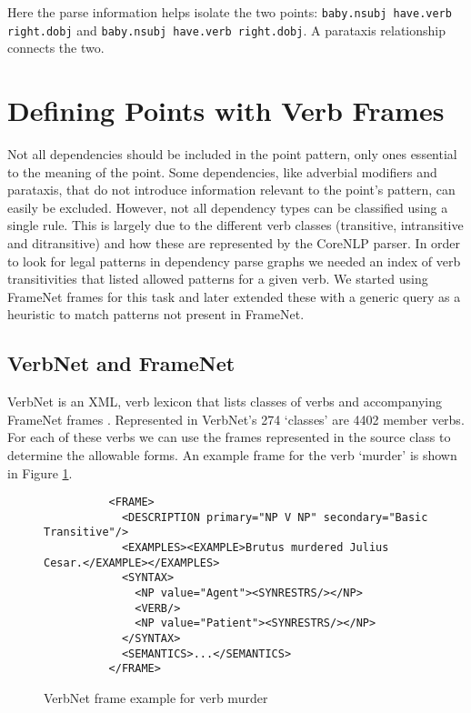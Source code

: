     Here the parse information helps isolate the two points: \texttt{baby.nsubj have.verb right.dobj} and \texttt{baby.nsubj have.verb right.dobj}. A parataxis relationship connects the two.

  \section{Defining Points with Verb Frames}
    Not all dependencies should be included in the point pattern, only ones essential to the meaning of the point. Some dependencies, like adverbial modifiers and parataxis, that do not introduce information relevant to the point's pattern, can easily be excluded. However, not all dependency types can be classified using a single rule. This is largely due to the different verb classes (transitive, intransitive and ditransitive) and how these are represented by the CoreNLP parser. In order to look for legal patterns in dependency parse graphs we needed an index of verb transitivities that listed allowed patterns for a given verb. We started using FrameNet frames for this task and later extended these with a generic query as a heuristic to match patterns not present in FrameNet.

    \tocless\subsection{VerbNet and FrameNet}
      VerbNet is an XML, verb lexicon that lists classes of verbs and accompanying FrameNet frames \cite{schuler2005verbnet,fillmore2002framenet}. Represented in VerbNet's 274 `classes' are 4402 member verbs. For each of these verbs we can use the frames represented in the source class to determine the allowable forms. An example frame for the verb `murder' is shown in Figure \ref{fig:murder-frame}.

      \begin{figure}
        \centering
        \caption{VerbNet frame example for verb murder}

        \lstset{language=XML}
        \begin{lstlisting}
          <FRAME>
            <DESCRIPTION primary="NP V NP" secondary="Basic Transitive"/>
            <EXAMPLES><EXAMPLE>Brutus murdered Julius Cesar.</EXAMPLE></EXAMPLES>
            <SYNTAX>
              <NP value="Agent"><SYNRESTRS/></NP>
              <VERB/>
              <NP value="Patient"><SYNRESTRS/></NP>
            </SYNTAX>
            <SEMANTICS>...</SEMANTICS>
          </FRAME>
        \end{lstlisting}
        \label{fig:murder-frame}
      \end{figure}

